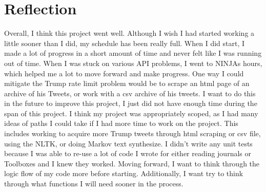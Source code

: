 \documentclass{article}
\begin{document}
\section{Reflection}
Overall, I think this project went well. Although I wish I had started working a little sooner than I did, my schedule has been really full. When I did start, I made a lot of progress in a short amount of time and never felt like I was running out of time. When I was stuck on various API problems, I went to NINJAs hours, which helped me a lot to move forward and make progress. One way I could mitigate the Trump rate limit problem would be to scrape an html page of an archive of his Tweets, or work with a csv archive of his tweets. I want to do this in the future to improve this project, I just did not have enough time during the span of this project. I think my project was appropriately scoped, as I had many ideas of paths I could take if I had more time to work on the project. This includes working to acquire more Trump tweets through html scraping or csv file, using the NLTK, or doing Markov text synthesize. I didn't write any unit tests because I was able to re-use a lot of code I wrote for either reading journals or Toolboxes and I knew they worked. Moving forward, I want to think through the logic flow of my code more before starting. Additionally, I want try to think through what functions I will need sooner in the process. 
\end{document}
